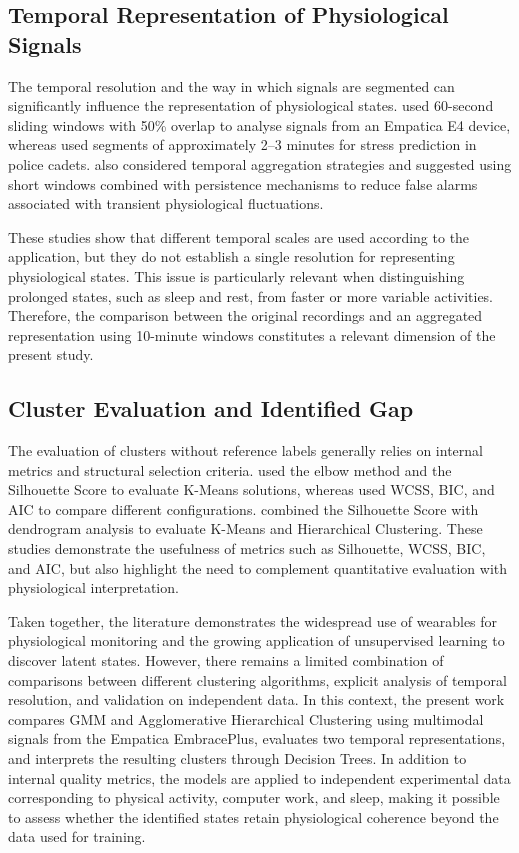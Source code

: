 \documentclass[a4paper,fleqn]{cas-sc}
\begin{document}
\subsection{Temporal Representation of Physiological Signals}

The temporal resolution and the way in which signals are segmented can significantly influence the representation of physiological states. \citet{goutham2025} used 60-second sliding windows with 50\% overlap to analyse signals from an Empatica E4 device, whereas \citet{sim2023} used segments of approximately 2--3 minutes for stress prediction in police cadets. \citet{albarran2025} also considered temporal aggregation strategies and suggested using short windows combined with persistence mechanisms to reduce false alarms associated with transient physiological fluctuations.

These studies show that different temporal scales are used according to the application, but they do not establish a single resolution for representing physiological states. This issue is particularly relevant when distinguishing prolonged states, such as sleep and rest, from faster or more variable activities. Therefore, the comparison between the original recordings and an aggregated representation using 10-minute windows constitutes a relevant dimension of the present study.

\subsection{Cluster Evaluation and Identified Gap}

The evaluation of clusters without reference labels generally relies on internal metrics and structural selection criteria. \citet{messaoud2025} used the elbow method and the Silhouette Score to evaluate K-Means solutions, whereas \citet{georgiev2026} used WCSS, BIC, and AIC to compare different configurations. \citet{georgieva2025} combined the Silhouette Score with dendrogram analysis to evaluate K-Means and Hierarchical Clustering. These studies demonstrate the usefulness of metrics such as Silhouette, WCSS, BIC, and AIC, but also highlight the need to complement quantitative evaluation with physiological interpretation.

\medskip

Taken together, the literature demonstrates the widespread use of wearables for physiological monitoring and the growing application of unsupervised learning to discover latent states. However, there remains a limited combination of comparisons between different clustering algorithms, explicit analysis of temporal resolution, and validation on independent data. In this context, the present work compares GMM and Agglomerative Hierarchical Clustering using multimodal signals from the Empatica EmbracePlus, evaluates two temporal representations, and interprets the resulting clusters through Decision Trees. In addition to internal quality metrics, the models are applied to independent experimental data corresponding to physical activity, computer work, and sleep, making it possible to assess whether the identified states retain physiological coherence beyond the data used for training.
\end{document}
